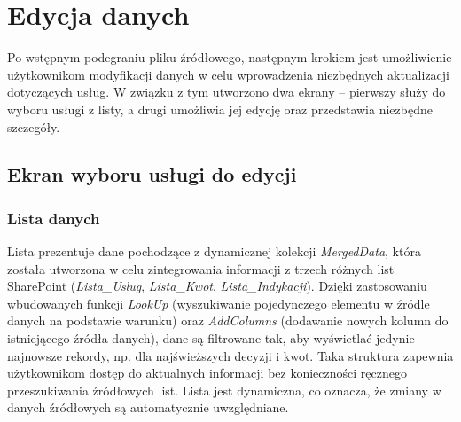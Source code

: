 \section{Edycja danych}

Po wstępnym podegraniu pliku źródłowego, następnym krokiem jest umożliwienie użytkownikom modyfikacji danych w celu wprowadzenia niezbędnych aktualizacji dotyczących usług. W związku z tym utworzono dwa ekrany -- pierwszy służy do wyboru usługi z listy, a drugi umożliwia jej edycję oraz przedstawia niezbędne szczegóły.

\subsection{Ekran wyboru usługi do edycji}

\begin{comment}

Ekran wyboru elementu do obróbki składa się z: \begin{enumerate}
    \item listy, przedstawiającej dane z tymczasowej kolekcji \textit{MergedData}, utworzonej specjalnie na potrzeby obsługi wyboru danych do edycji,
    \item pól wyszukiwania i filtrów, umożliwiających zawężenie listy na podstawie nazwy usługi, identyfikatora (\textit{Service ID}), miejsca powstawania kosztów (\textit{MPK}) oraz statusu decyzji (\textit{Accepted}, \textit{Not Accepted}, \textit{No Status}),
    \item wykresu kołowego, prezentującego wizualne podsumowanie liczby elementów w każdej kategorii statusu decyzji,
    \item interfejsu umożliwiającego dynamiczne dopasowanie wyników listy w czasie rzeczywistym, na podstawie wprowadzonych kryteriów wyszukiwania,
    \item nagłówka, który przedstawia kontekst użytkownika, w tym nazwę i dane aktualnie zalogowanego użytkownika. \end{enumerate}
\end{comment}

\subsubsection*{Lista danych}
Lista prezentuje dane pochodzące z dynamicznej kolekcji \textit{MergedData}, która została utworzona w celu zintegrowania informacji z trzech różnych list SharePoint (\textit{Lista\_Uslug}, \textit{Lista\_Kwot}, \textit{Lista\_Indykacji}). Dzięki zastosowaniu wbudowanych funkcji \textit{LookUp} (wyszukiwanie pojedynczego elementu w źródle danych na podstawie warunku) oraz \textit{AddColumns} (dodawanie nowych kolumn do istniejącego źródła danych), dane są filtrowane tak, aby wyświetlać jedynie najnowsze rekordy, np. dla najświeższych decyzji i kwot. Taka struktura zapewnia użytkownikom dostęp do aktualnych informacji bez konieczności ręcznego przeszukiwania źródłowych list. Lista jest dynamiczna, co oznacza, że zmiany w danych źródłowych są automatycznie uwzględniane.

